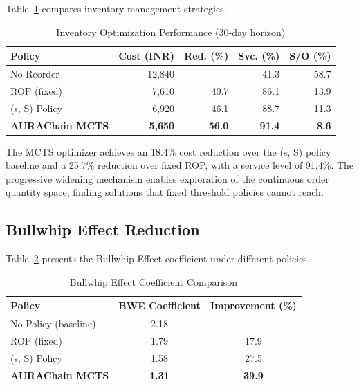 \documentclass[conference]{IEEEtran}
\begin{document}
Table~\ref{tab:optimization_results} compares inventory management strategies.

\begin{table}[htbp]
\caption{Inventory Optimization Performance (30-day horizon)}
\label{tab:optimization_results}
\centering
\scriptsize
\setlength{\tabcolsep}{3pt}
\begin{tabular}{@{}lrrrr@{}}
\toprule
\textbf{Policy} & \textbf{Cost (INR)} & \textbf{Red. (\%)} & \textbf{Svc. (\%)} & \textbf{S/O (\%)} \\
\midrule
No Reorder & 12,840 & --- & 41.3 & 58.7 \\
ROP (fixed) & 7,610 & 40.7 & 86.1 & 13.9 \\
(s, S) Policy & 6,920 & 46.1 & 88.7 & 11.3 \\
\textbf{AURAChain MCTS} & \textbf{5,650} & \textbf{56.0} & \textbf{91.4} & \textbf{8.6} \\
\bottomrule
\end{tabular}
\end{table}

The MCTS optimizer achieves an 18.4\% cost reduction over the (s, S) policy baseline and a 25.7\% reduction over fixed ROP, with a service level of 91.4\%. The progressive widening mechanism enables exploration of the continuous order quantity space, finding solutions that fixed threshold policies cannot reach.

\subsection{Bullwhip Effect Reduction}

Table~\ref{tab:bullwhip_results} presents the Bullwhip Effect coefficient under different policies.

\begin{table}[htbp]
\caption{Bullwhip Effect Coefficient Comparison}
\label{tab:bullwhip_results}
\centering
\begin{tabular}{@{}lcc@{}}
\toprule
\textbf{Policy} & \textbf{BWE Coefficient} & \textbf{Improvement (\%)} \\
\midrule
No Policy (baseline) & 2.18 & --- \\
ROP (fixed) & 1.79 & 17.9 \\
(s, S) Policy & 1.58 & 27.5 \\
\textbf{AURAChain MCTS} & \textbf{1.31} & \textbf{39.9} \\
\bottomrule
\end{tabular}
\end{table}
\end{document}
